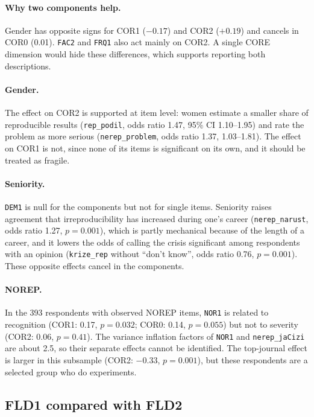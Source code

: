 \documentclass[11pt,a4paper]{article}
\newcommand{\var}[1]{\texttt{#1}}
\begin{document}
\paragraph{Why two components help.}
Gender has opposite signs for COR1 ($-0.17$) and COR2 ($+0.19$) and cancels in COR0 (0.01). \var{FAC2} and \var{FRQ1} also act mainly on COR2. A single CORE dimension would hide these differences, which supports reporting both descriptions.

\paragraph{Gender.}
The effect on COR2 is supported at item level: women estimate a smaller share of reproducible results (\var{rep\_podil}, odds ratio 1.47, 95\% CI 1.10--1.95) and rate the problem as more serious (\var{nerep\_problem}, odds ratio 1.37, 1.03--1.81). The effect on COR1 is not, since none of its items is significant on its own, and it should be treated as fragile.

\paragraph{Seniority.}
\var{DEM1} is null for the components but not for single items. Seniority raises agreement that irreproducibility has increased during one's career (\var{nerep\_narust}, odds ratio 1.27, $p=0.001$), which is partly mechanical because of the length of a career, and it lowers the odds of calling the crisis significant among respondents with an opinion (\var{krize\_rep} without ``don't know'', odds ratio 0.76, $p=0.001$). These opposite effects cancel in the components.

\paragraph{NOREP.}
In the 393 respondents with observed NOREP items, \var{NOR1} is related to recognition (COR1: 0.17, $p=0.032$; COR0: 0.14, $p=0.055$) but not to severity (COR2: 0.06, $p=0.41$). The variance inflation factors of \var{NOR1} and \var{nerep\_jaCizi} are about 2.5, so their separate effects cannot be identified. The top-journal effect is larger in this subsample (COR2: $-0.33$, $p=0.001$), but these respondents are a selected group who do experiments.

\subsection{FLD1 compared with FLD2}
\label{sec:wald}
\end{document}
